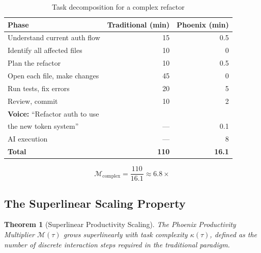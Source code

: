 \documentclass[11pt, a4paper]{article}
\newtheorem{theorem}{Theorem}
\begin{document}
\begin{table}[h]
\centering
\begin{tabular}{@{}lrr@{}}
\toprule
\textbf{Phase} & \textbf{Traditional (min)} & \textbf{Phoenix (min)} \\
\midrule
Understand current auth flow           & 15  & 0.5 \\
Identify all affected files            & 10  & 0   \\
Plan the refactor                      & 10  & 0.5 \\
Open each file, make changes           & 45  & 0   \\
Run tests, fix errors                  & 20  & 5   \\
Review, commit                         & 10  & 2   \\
\midrule
\textbf{Voice:} ``Refactor auth to use  &     &     \\
\quad the new token system''           & --- & 0.1 \\
AI execution                           & --- & 8   \\
\midrule
\textbf{Total}                         & \textbf{110} & \textbf{16.1} \\
\bottomrule
\end{tabular}
\caption{Task decomposition for a complex refactor}
\label{tab:example2}
\end{table}

\begin{equation}
  \mathcal{M}_{\text{complex}} = \frac{110}{16.1} \approx 6.8\times
\end{equation}

\subsection{The Superlinear Scaling Property}

\begin{theorem}[Superlinear Productivity Scaling]
\label{thm:superlinear}
The Phoenix Productivity Multiplier $\mathcal{M}(\tau)$ grows superlinearly with
task complexity $\kappa(\tau)$, defined as the number of discrete interaction
steps required in the traditional paradigm.
\end{theorem}
\end{document}
